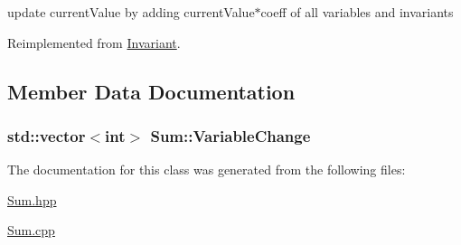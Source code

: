 update current\-Value by adding current\-Value$\ast$coeff of all variables and invariants 



Reimplemented from \hyperlink{class_invariant_ab3fd6fa5c99ed9854756347a439e0fd9}{Invariant}.



\subsection{Member Data Documentation}
\hypertarget{class_sum_a10e9f89fdcf0f674e0280629144b3f92}{
\subsubsection[{Variable\-Change}]{\setlength{\rightskip}{0pt plus 5cm}std\-::vector$<$int$>$ Sum\-::\-Variable\-Change\hspace{0.3cm}{\ttfamily [protected]}}}\label{class_sum_a10e9f89fdcf0f674e0280629144b3f92}


The documentation for this class was generated from the following files\-:\begin{DoxyCompactItemize}
\item 
\hyperlink{_sum_8hpp}{Sum.\-hpp}\item 
\hyperlink{_sum_8cpp}{Sum.\-cpp}\end{DoxyCompactItemize}
